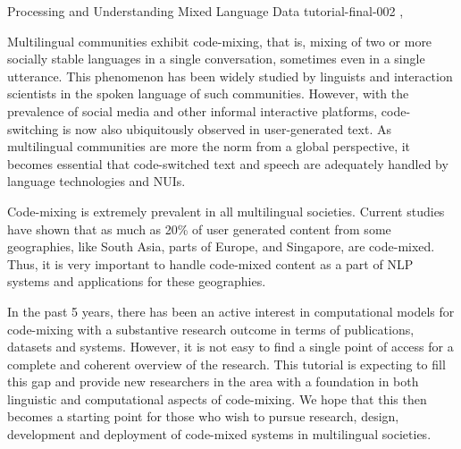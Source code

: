 \begin{tutorial}
  {Processing and Understanding Mixed Language Data}
  {tutorial-final-002}
  {\daydateyear, \tutorialmorningtime}
  {\TutLocB}

Multilingual communities exhibit code-mixing, that is, mixing of two or more socially stable languages in a single conversation, sometimes even in a single utterance. This phenomenon has been widely studied by linguists and interaction scientists in the spoken language of such communities. However, with the prevalence of social media and other informal interactive platforms, code-switching is now also ubiquitously observed in user-generated text. As multilingual communities are more the norm from a global perspective, it becomes essential that code-switched text and speech are adequately handled by language technologies and NUIs.

Code-mixing is extremely prevalent in all multilingual societies. Current studies have shown that as much as 20\% of user generated content from some geographies, like South Asia, parts of Europe, and Singapore, are code-mixed. Thus, it is very important to handle code-mixed content as a part of NLP systems and applications for these geographies.

In the past 5 years, there has been an active interest in computational models for code-mixing with a substantive research outcome in terms of publications, datasets and systems. However, it is not easy to find a single point of access for a complete and coherent overview of the research. This tutorial is expecting to fill this gap and provide new researchers in the area with a foundation in both linguistic and computational aspects of code-mixing. We hope that this then becomes a starting point for those who wish to pursue research, design, development and deployment of code-mixed systems in multilingual societies.

\end{tutorial}
